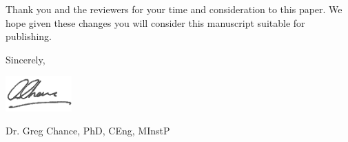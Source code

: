 \documentclass[11pt, a4paper]{letter} %
\begin{document}
\begin{letter}
\bigskip

Thank you and the reviewers for your time and consideration to this paper. We hope given these changes you will consider this manuscript suitable for publishing. 

\bigskip

Sincerely,

\bigskip

\includegraphics[width=1in]{signature.png}

Dr. Greg Chance, PhD, CEng, MInstP

\end{letter}
\end{document}
